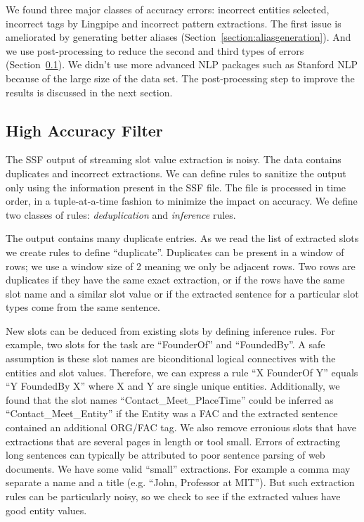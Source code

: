 We found three major classes of accuracy errors: incorrect entities selected, incorrect tags by Lingpipe and incorrect pattern extractions. The first issue is ameliorated by generating better aliases (Section~\ref{section:aliasgeneration}). And we use post-processing to reduce the second and third types of errors (Section~\ref{section:highAccuracyFilter}). We didn't use more advanced NLP packages such as Stanford NLP because of the large size of the data set. The post-processing step to improve the results is discussed in the next section.

\subsection{High Accuracy Filter}
\label{section:highAccuracyFilter}

The SSF output of streaming slot value extraction is noisy. The data contains duplicates and incorrect extractions. We can define rules to sanitize the output only using the information present in the SSF file. The file is processed in time order, in a tuple-at-a-time fashion to minimize the impact on accuracy. We define two classes of rules: \textit{deduplication} and \textit{inference} rules.

The output contains many duplicate entries. As we read the list of extracted slots we create rules to define ``duplicate''. Duplicates can be present in a window of rows; we use a window size of 2 meaning we only be adjacent rows. Two rows are duplicates if they have the same exact extraction, or if the rows have the same slot name and a similar slot value or if the extracted sentence for a particular slot types come from the same sentence.

 New slots can be deduced from existing slots by defining inference rules. For example, two slots for the task are ``FounderOf'' and ``FoundedBy''. A safe assumption is these slot names are biconditional logical connectives with the entities and slot values. Therefore, we can express a rule ``X FounderOf Y'' equals ``Y FoundedBy X'' where X and Y are single unique entities. Additionally, we found that the slot names ``Contact\_Meet\_PlaceTime'' could be inferred as ``Contact\_Meet\_Entity'' if the Entity was a FAC and the extracted sentence contained an additional ORG/FAC tag. We also remove erronious slots that have extractions that are several pages in length or tool small. Errors of extracting long sentences can typically be 
attributed to poor sentence parsing of web documents. We have some valid ``small'' extractions. For example a comma may separate a name and a title (e.g. ``John, Professor at MIT''). But such extraction rules can be particularly noisy, so we check to see if the extracted values have good entity values.




